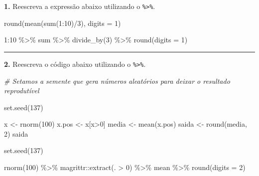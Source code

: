 \documentclass[
]{book}
\newenvironment{Shaded}{\begin{snugshade}}{\end{snugshade}}
\newcommand{\AttributeTok}[1]{\textcolor[rgb]{0.77,0.63,0.00}{#1}}
\newcommand{\CommentTok}[1]{\textcolor[rgb]{0.56,0.35,0.01}{\textit{#1}}}
\newcommand{\DecValTok}[1]{\textcolor[rgb]{0.00,0.00,0.81}{#1}}
\newcommand{\FunctionTok}[1]{\textcolor[rgb]{0.00,0.00,0.00}{#1}}
\newcommand{\NormalTok}[1]{#1}
\newcommand{\OtherTok}[1]{\textcolor[rgb]{0.56,0.35,0.01}{#1}}
\newcommand{\SpecialCharTok}[1]{\textcolor[rgb]{0.00,0.00,0.00}{#1}}
\begin{document}
\textbf{1.} Reescreva a expressão abaixo utilizando o \texttt{\%\textgreater{}\%}.

\begin{Shaded}
\begin{Highlighting}[]
\FunctionTok{round}\NormalTok{(}\FunctionTok{mean}\NormalTok{(}\FunctionTok{sum}\NormalTok{(}\DecValTok{1}\SpecialCharTok{:}\DecValTok{10}\NormalTok{)}\SpecialCharTok{/}\DecValTok{3}\NormalTok{), }\AttributeTok{digits =} \DecValTok{1}\NormalTok{)}

\DecValTok{1}\SpecialCharTok{:}\DecValTok{10} \SpecialCharTok{\%\textgreater{}\%}
\NormalTok{  sum }\SpecialCharTok{\%\textgreater{}\%}
  \FunctionTok{divide\_by}\NormalTok{(}\DecValTok{3}\NormalTok{) }\SpecialCharTok{\%\textgreater{}\%}
  \FunctionTok{round}\NormalTok{(}\AttributeTok{digits =} \DecValTok{1}\NormalTok{)}
\end{Highlighting}
\end{Shaded}

\begin{center}\rule{0.5\linewidth}{0.5pt}\end{center}

\textbf{2.} Reescreva o código abaixo utilizando o \texttt{\%\textgreater{}\%}.

\begin{Shaded}
\begin{Highlighting}[]
\CommentTok{\# Setamos a semente que gera números aleatórios para deixar o resultado reprodutível}

\FunctionTok{set.seed}\NormalTok{(}\DecValTok{137}\NormalTok{)}

\NormalTok{x }\OtherTok{\textless{}{-}} \FunctionTok{rnorm}\NormalTok{(}\DecValTok{100}\NormalTok{)}
\NormalTok{x.pos }\OtherTok{\textless{}{-}}\NormalTok{ x[x}\SpecialCharTok{\textgreater{}}\DecValTok{0}\NormalTok{]}
\NormalTok{media }\OtherTok{\textless{}{-}} \FunctionTok{mean}\NormalTok{(x.pos)}
\NormalTok{saida }\OtherTok{\textless{}{-}} \FunctionTok{round}\NormalTok{(media, }\DecValTok{2}\NormalTok{)}
\NormalTok{saida}
\end{Highlighting}
\end{Shaded}

\begin{Shaded}
\begin{Highlighting}[]
\FunctionTok{set.seed}\NormalTok{(}\DecValTok{137}\NormalTok{)}

\FunctionTok{rnorm}\NormalTok{(}\DecValTok{100}\NormalTok{) }\SpecialCharTok{\%\textgreater{}\%}
\NormalTok{  magrittr}\SpecialCharTok{::}\FunctionTok{extract}\NormalTok{(. }\SpecialCharTok{\textgreater{}} \DecValTok{0}\NormalTok{) }\SpecialCharTok{\%\textgreater{}\%}
\NormalTok{  mean }\SpecialCharTok{\%\textgreater{}\%}
  \FunctionTok{round}\NormalTok{(}\AttributeTok{digits =} \DecValTok{2}\NormalTok{)}
\end{Highlighting}
\end{Shaded}
\end{document}
